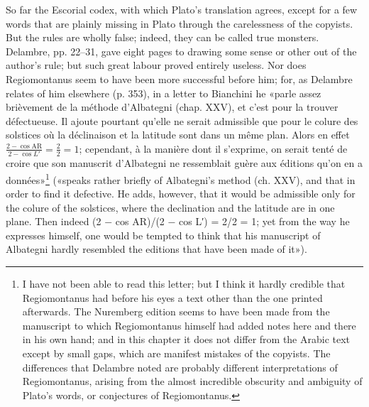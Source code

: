 \documentclass[11pt]{article}
\begin{document}
\par So far the Escorial codex, with which Plato's translation agrees, except for a few words that are plainly missing in Plato through the carelessness of the copyists. But the rules are wholly false; indeed, they can be called true monsters. Delambre, pp. 22–31, gave eight pages to drawing some sense or other out of the author's rule; but such great labour proved entirely useless. Nor does Regiomontanus seem to have been more successful before him; for, as Delambre relates of him elsewhere (p. 353), in a letter to Bianchini he «parle assez brièvement de la méthode d’Albategni (chap. XXV), et c’est pour la trouver défectueuse. Il ajoute pourtant qu’elle ne serait admissible que pour le colure des solstices où la déclinaison et la latitude sont dans un même plan. Alors en effet $\frac{2 - \cos \text{AR}}{2 - \cos L'} = \frac{2}{2} = 1$; cependant, à la manière dont il s’exprime, on serait tenté de croire que son manuscrit d’Albategni ne ressemblait guère aux éditions qu’on en a données»\footnote{I have not been able to read this letter; but I think it hardly credible that Regiomontanus had before his eyes a text other than the one printed afterwards. The Nuremberg edition seems to have been made from the manuscript to which Regiomontanus himself had added notes here and there in his own hand; and in this chapter it does not differ from the Arabic text except by small gaps, which are manifest mistakes of the copyists. The differences that Delambre noted are probably different interpretations of Regiomontanus, arising from the almost incredible obscurity and ambiguity of Plato's words, or conjectures of Regiomontanus.} («speaks rather briefly of Albategni's method (ch. XXV), and that in order to find it defective. He adds, however, that it would be admissible only for the colure of the solstices, where the declination and the latitude are in one plane. Then indeed (2 − cos AR)/(2 − cos L′) = 2/2 = 1; yet from the way he expresses himself, one would be tempted to think that his manuscript of Albategni hardly resembled the editions that have been made of it»).\par
\end{document}

